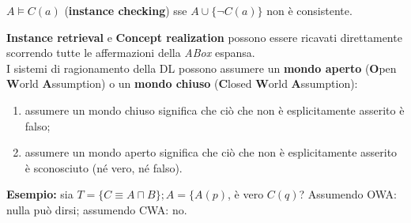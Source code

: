 $A \models C(a)$ (\textbf{instance checking}) sse $A \cup \lbrace \lnot C(a) \rbrace$ non è consistente.

\textbf{Instance retrieval} e \textbf{Concept realization} possono essere ricavati direttamente scorrendo tutte le affermazioni della \textit{ABox} espansa.
\\

I sistemi di ragionamento della DL possono assumere un \textbf{mondo aperto} (\textbf{O}pen \textbf{W}orld \textbf{A}ssumption) o un \textbf{mondo chiuso} (\textbf{C}losed \textbf{W}orld \textbf{A}ssumption):
\begin{enumerate}
\item assumere un mondo chiuso significa che ciò che non è esplicitamente asserito è falso;
\item assumere un mondo aperto significa che ciò che non è esplicitamente asserito è sconosciuto (né vero, né falso).
\end{enumerate}

\textbf{Esempio:} sia $T = \lbrace C \equiv A \sqcap B \rbrace; A = \lbrace A(p)$, è vero $C(q)$? Assumendo OWA: nulla può dirsi; assumendo CWA: no.